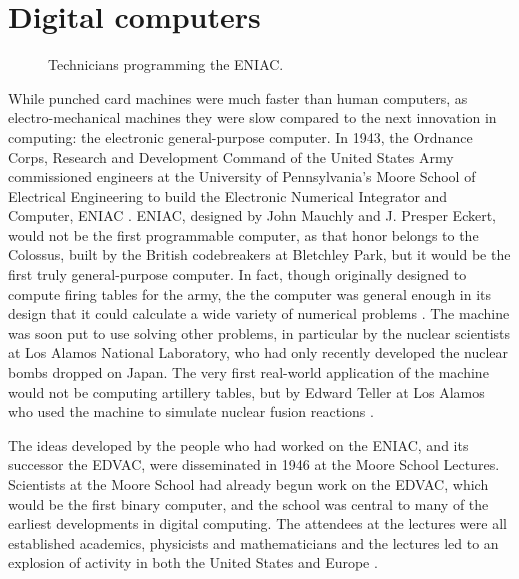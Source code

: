 \documentclass[\rootfolder/main.tex]{subfiles}
\begin{document}
\section{Digital computers}

\begin{figure}[ht]
    \caption{Technicians programming the ENIAC.\label{fig:eniac}}
\end{figure}

While punched card machines were much faster than human computers, as electro-mechanical machines they were slow compared to the next innovation in computing: the electronic general-purpose computer.
In 1943, the Ordnance Corps, Research and Development Command of the United States Army commissioned engineers at the University of Pennsylvania's Moore School of Electrical Engineering
to build the Electronic Numerical Integrator and Computer, ENIAC \cite{sep-computing-history}\cite{reed1952}.
ENIAC, designed by John Mauchly and J. Presper Eckert, would not be the first programmable computer, as that honor belongs to the Colossus,
built by the British codebreakers at Bletchley Park\cite{winegrad1996}, but it would be the first truly general-purpose computer.
In fact, though originally designed to compute firing tables for the army, the the computer was general enough in its design that it could calculate a wide variety of numerical problems \cite{neyer}.
The machine was soon put to use solving other problems, in particular by the nuclear scientists at Los Alamos National Laboratory, who had only recently developed the nuclear bombs dropped on Japan.
The very first real-world application of the machine would not be computing artillery tables, but by Edward Teller at Los Alamos who used the machine to simulate nuclear fusion reactions \cite{AtomicHeritageFoundation}.

The ideas developed by the people who had worked on the ENIAC, and its successor the EDVAC, were disseminated in 1946 at the Moore School Lectures.
Scientists at the Moore School had already begun work on the EDVAC, which would be the first binary computer,
and the school was central to many of the earliest developments in digital computing.
The attendees at the lectures were all established academics, physicists and mathematicians and the lectures led to an explosion of activity in both the United States and Europe \cite{Davis2008}.
\end{document}

